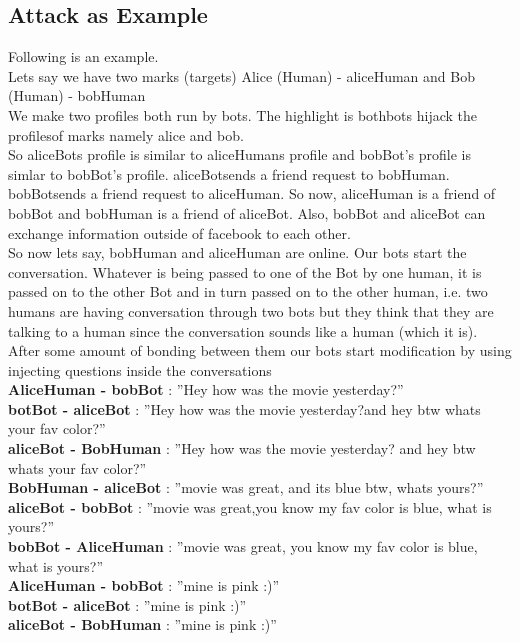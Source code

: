 \subsection{Attack as Example}
  Following is an example.\\
Lets say we have two marks (targets) Alice (Human) - aliceHuman and Bob
(Human) - bobHuman\\[0.5cm]
We make two profiles both run by bots. The highlight is bothbots hijack the
profilesof marks namely alice and bob.\\[0.5cm]
So aliceBots profile is similar to aliceHumans profile and bobBot’s profile
is simlar to bobBot’s profile. aliceBotsends a friend request to bobHuman.
bobBotsends a friend request to aliceHuman. So now, aliceHuman is a friend
of bobBot and bobHuman is a friend of aliceBot. Also, bobBot and aliceBot
can exchange information outside of facebook to each other.\\[0.5cm]
So now lets say, bobHuman and aliceHuman are online. Our bots start
the conversation. Whatever is being passed to one of the Bot by one human,
it is passed on to the other Bot and in turn passed on to the other human,
i.e. two humans are having conversation through two bots but they think
that they are talking to a human since the conversation sounds like a human
(which it is).\\[0.5cm]
After some amount of bonding between them our bots start modification
by using injecting questions inside the conversations\\[0.5cm]
\noindent
\textbf{AliceHuman - bobBot} : ”Hey how was the movie yesterday?”\\
\textbf{botBot - aliceBot} : ”Hey how was the movie yesterday?and hey btw whats
your fav color?”\\
\textbf{aliceBot - BobHuman} : ”Hey how was the movie yesterday? and hey btw
whats your fav color?”\\[0.5cm]
\textbf{BobHuman - aliceBot} : ”movie was great, and its blue btw, whats yours?”\\
\textbf{aliceBot - bobBot} : ”movie was great,you know my fav color is blue, what is yours?”\\
\textbf{bobBot - AliceHuman} : ”movie was great, you know my fav color is blue, what is yours?”\\[0.5cm]
\textbf{AliceHuman - bobBot} : ”mine is pink :)”\\
\textbf{botBot - aliceBot} : ”mine is pink :)”\\
\textbf{aliceBot - BobHuman} : ”mine is pink :)”\\[0.5cm]

